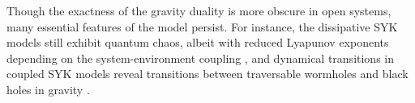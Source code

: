 \documentclass[prl,superscriptaddress,notitlepage,showpacs,twocolumn]{revtex4-2}
\begin{document}
Though the exactness of the gravity duality is more obscure in open systems, many essential features of the model persist. For instance, the dissipative SYK models still exhibit quantum chaos, albeit with reduced Lyapunov exponents depending on the system-environment coupling \cite{chen2017tunable,garcia2024lyapunov}, and dynamical transitions in coupled SYK models reveal transitions between traversable wormholes and black holes in gravity \cite{garcia2023keldysh,kawabata2023dynamical,garcia2021euclidean,garcia2022dominance,li2021free}. %
\end{document}
